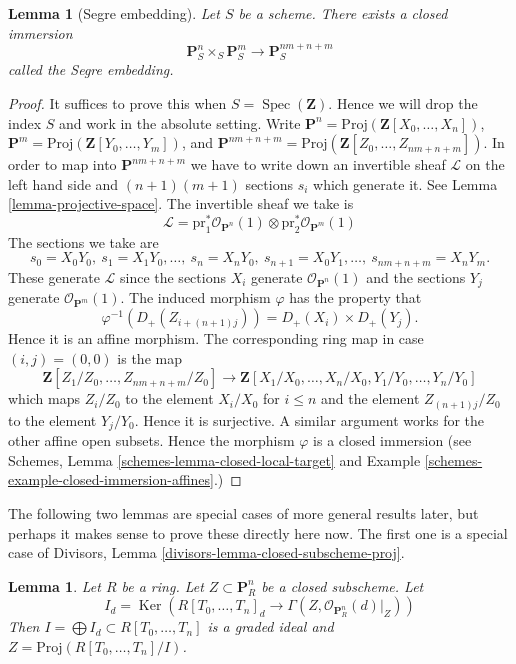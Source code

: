 \documentclass{stacks-project}
\theoremstyle{plain}
\newtheorem{lemma}[subsection]{Lemma}
\theoremstyle{definition}
\theoremstyle{remark}
\numberwithin{equation}{subsection}
\def\Spec{\mathop{\mathrm{Spec}}}
\def\Ker{\mathop{\mathrm{Ker}}}
\begin{document}
\begin{lemma}[Segre embedding]
\label{lemma-segre-embedding}
Let $S$ be a scheme. There exists a closed immersion
$$
\mathbf{P}^n_S \times_S \mathbf{P}^m_S
\longrightarrow
\mathbf{P}^{nm + n + m}_S
$$
called the {\it Segre embedding}.
\end{lemma}

\begin{proof}
It suffices to prove this when $S = \Spec(\mathbf{Z})$.
Hence we will drop the index $S$ and work in the absolute setting.
Write $\mathbf{P}^n = \text{Proj}(\mathbf{Z}[X_0, \ldots, X_n])$,
$\mathbf{P}^m = \text{Proj}(\mathbf{Z}[Y_0, \ldots, Y_m])$,
and
$\mathbf{P}^{nm + n + m} =
\text{Proj}(\mathbf{Z}[Z_0, \ldots, Z_{nm + n + m}])$.
In order to map into $\mathbf{P}^{nm + n + m}$ we have to
write down an invertible sheaf $\mathcal{L}$ on the left hand
side and $(n + 1)(m + 1)$ sections $s_i$ which generate it.
See Lemma \ref{lemma-projective-space}.
The invertible sheaf we take is
$$
\mathcal{L} =
\text{pr}_1^*\mathcal{O}_{\mathbf{P}^n}(1)
\otimes
\text{pr}_2^*\mathcal{O}_{\mathbf{P}^m}(1)
$$
The sections we take are
$$
s_0 = X_0Y_0, \ s_1 = X_1Y_0, \ldots, \ s_n = X_nY_0,
\ s_{n + 1} = X_0Y_1, \ldots, \ s_{nm + n + m} = X_nY_m.
$$
These generate $\mathcal{L}$ since the sections $X_i$ generate
$\mathcal{O}_{\mathbf{P}^n}(1)$ and the sections $Y_j$ generate
$\mathcal{O}_{\mathbf{P}^m}(1)$. The induced morphism
$\varphi$ has the property that
$$
\varphi^{-1}(D_{+}(Z_{i + (n + 1)j})) = D_{+}(X_i) \times D_{+}(Y_j).
$$
Hence it is an affine morphism. The corresponding ring map in case
$(i, j) = (0, 0)$ is the map
$$
\mathbf{Z}[Z_1/Z_0, \ldots, Z_{nm + n + m}/Z_0]
\longrightarrow
\mathbf{Z}[X_1/X_0, \ldots, X_n/X_0, Y_1/Y_0, \ldots, Y_n/Y_0]
$$
which maps $Z_i/Z_0$ to the element $X_i/X_0$ for $i \leq n$ and
the element $Z_{(n + 1)j}/Z_0$ to the element $Y_j/Y_0$. Hence it
is surjective. A similar argument works for the other affine
open subsets. Hence the morphism $\varphi$ is a closed immersion
(see Schemes, Lemma \ref{schemes-lemma-closed-local-target} and
Example \ref{schemes-example-closed-immersion-affines}.)
\end{proof}

\noindent
The following two lemmas are special cases of more general results later, but
perhaps it makes sense to prove these directly here now. The first one is
a special case of Divisors, Lemma \ref{divisors-lemma-closed-subscheme-proj}.

\begin{lemma}
\label{lemma-closed-in-projective-space}
Let $R$ be a ring. Let $Z \subset \mathbf{P}^n_R$ be a closed subscheme.
Let
$$
I_d = \Ker\left(
R[T_0, \ldots, T_n]_d
\longrightarrow
\Gamma(Z, \mathcal{O}_{\mathbf{P}^n_R}(d)|_Z)\right)
$$
Then $I = \bigoplus I_d \subset R[T_0, \ldots, T_n]$ is
a graded ideal and $Z = \text{Proj}(R[T_0, \ldots, T_n]/I)$.
\end{lemma}
\end{document}
